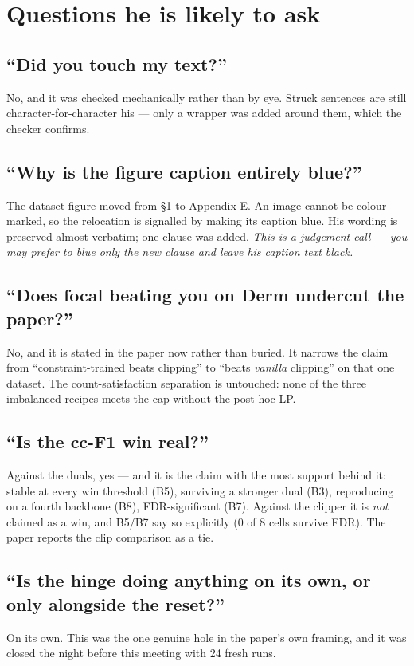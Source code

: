 \documentclass[11pt,a4paper]{article}
\begin{document}
\section{Questions he is likely to ask}

\subsection{``Did you touch my text?''}
No, and it was checked mechanically rather than by eye. Struck sentences are still
character-for-character his --- only a wrapper was added around them, which the checker
confirms.

\subsection{``Why is the figure caption entirely blue?''}
The dataset figure moved from \S1 to Appendix E. An image cannot be colour-marked, so the
relocation is signalled by making its caption blue. His wording is preserved almost
verbatim; one clause was added. \emph{This is a judgement call --- you may prefer to blue
only the new clause and leave his caption text black.}

\subsection{``Does focal beating you on Derm undercut the paper?''}
No, and it is stated in the paper now rather than buried. It narrows the claim from
``constraint-trained beats clipping'' to ``beats \emph{vanilla} clipping'' on that one
dataset. The count-satisfaction separation is untouched: none of the three imbalanced
recipes meets the cap without the post-hoc LP.

\subsection{``Is the cc-F1 win real?''}
Against the duals, yes --- and it is the claim with the most support behind it: stable at
every win threshold (B5), surviving a stronger dual (B3), reproducing on a fourth backbone
(B8), FDR-significant (B7). Against the clipper it is \emph{not} claimed as a win, and B5/B7
say so explicitly (0 of 8 cells survive FDR). The paper reports the clip comparison as a
tie.

\subsection{``Is the hinge doing anything on its own, or only alongside the reset?''}
\label{sec:hingealone}
On its own. This was the one genuine hole in the paper's own framing, and it was closed the
night before this meeting with 24 fresh runs.
\end{document}
